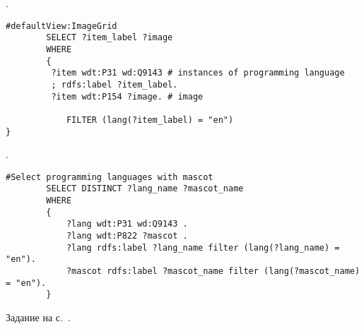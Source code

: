 \begin{task}
    \label{answer:prog_lang_2}
    . 
	\begin{lstlisting}[language=SPARQL, caption={{Логотипы языков программирования}\protect\footnotemark}, label=lst:prog_lang_answer_1]
		#defaultView:ImageGrid
		SELECT ?item_label ?image
		WHERE
		{
		 ?item wdt:P31 wd:Q9143 # instances of programming language
		 ; rdfs:label ?item_label. 
		 ?item wdt:P154 ?image. # image
		 	
		 	FILTER (lang(?item_label) = "en")
}
	\end{lstlisting}

\end{task}

\begin{task}
    \label{answer:prog_lang_3}
    
\end{task}

\begin{task}
    \label{answer:prog_langs_4}
    . 
	\begin{lstlisting}[language=SPARQL, caption={{"Персонажи-талисманы" языков программирования}\protect\footnotemark}, label=lst:prog_lang_answer_4]
		#Select programming languages with mascot
		SELECT DISTINCT ?lang_name ?mascot_name
		WHERE
		{
		    ?lang wdt:P31 wd:Q9143 .
		    ?lang wdt:P822 ?mascot .
		    ?lang rdfs:label ?lang_name filter (lang(?lang_name) = "en").
		    ?mascot rdfs:label ?mascot_name filter (lang(?mascot_name) = "en").
		}
	\end{lstlisting}
    
    \small{Задание на с.~\pageref{prog_lang_test}.}
\end{task}

